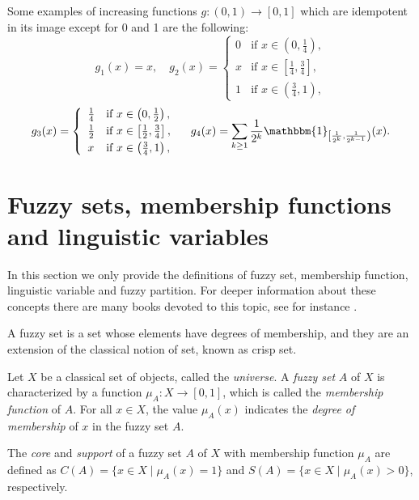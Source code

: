 \begin{example} Some examples of increasing functions $g:(0,1) \to [0,1]$ which are idempotent in its image except for 0 and 1 are the following:
	$$ g_1(x)=x, 
	\quad 
	g_2(x)= \left\{ \begin{array}{ll}
		0 &  \text{if }  x \in \left(0,\frac{1}{4}\right), \\[3pt]
		x & \text{if }  x \in \left[\frac{1}{4},\frac{3}{4}\right],\\[3pt]
		1 &  \text{if }  x \in \left(\frac{3}{4},1\right),
	\end{array}
	\right.
	$$
	$$
	g_3(x)= \left\{ \begin{array}{ll}
		\frac{1}{4} &  \text{if }  x \in \left(0,\frac{1}{2}\right), \\[3pt]
		\frac{1}{2} & \text{if }  x \in \left[\frac{1}{2},\frac{3}{4}\right],\\[3pt]
		x &  \text{if }  x \in \left(\frac{3}{4},1\right),
	\end{array}
	\right.
	\quad
	g_4(x)= \sum_{k \geq 1} \frac{1}{2^k} \mathbbm{1}_{\left[\frac{1}{2^k},\frac{1}{2^{k-1}}\right)}(x).
	$$
\end{example}

\section{Fuzzy sets, membership functions and linguistic variables}

In this section we only provide the definitions of fuzzy set, membership function, linguistic variable and fuzzy partition. For deeper information about these concepts there are many books devoted to this topic, see for instance \cite{Cox1994,Klir1995,Zimmermann1991,Nguyen2018}.

A fuzzy set is a set whose elements have degrees of membership, and they are an extension of the classical notion of set, known as crisp set.
\begin{definition}\label{def:fuzzyset}
	Let $X$ be a classical set of objects, called the \emph{universe}. A \emph{fuzzy set} $A$ of $X$ is characterized by a function $\mu_A: X \to [0,1]$, which is called the \emph{membership function} of $A$. For all $x \in X$,  the value $\mu_A(x)$ indicates the \emph{degree of membership} of $x$ in the fuzzy set $A$.
\end{definition}

The \textit{core} and \textit{support} of a fuzzy set $A$ of $X$ with membership function $\mu_A$ are defined as $C(A)= \{ x \in X \mid \mu_A(x)=1\}$ and $S(A)= \{x \in X \mid \mu_A(x)>0\}$, respectively.

